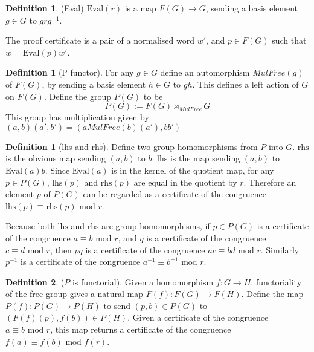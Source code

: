 \documentclass[11pt]{article} %
\theoremstyle{definition}
\theoremstyle{definition}
\theoremstyle{definition}
\theoremstyle{definition}
\theoremstyle{definition}
\newtheorem{defn}[theorem]{Definition}
\theoremstyle{definition}
\newtheorem{subdef}{Definition}[theorem]
\begin{document}
\begin{defn}(Eval)
  $\text{Eval}(r)$ is a map $F(G) \to G$, sending a basis element $g \in G$ to $grg^{-1}$.
\end{defn}

The proof certificate is a pair of a normalised word $w'$, and
$p \in F(G)$ such that \newline $w = \text{Eval}(p) w'$.

\begin{defn}[P functor]
  For any $g \in G$ define an automorphism $MulFree(g)$ of $F(G)$, by sending a basis
  element $h \in G$ to $gh$. This defines a left action of $G$ on $F(G)$.
  Define the group $P(G)$ to be
  \begin{equation}
  P(G) := F(G) \rtimes_{MulFree} G
  \end{equation}
  This group has multiplication given by $(a, b) (a', b') = (a MulFree(b)(a'), bb')$
\end{defn}

\begin{subdef}[lhs and rhs]
Define two group homomorphisms from $P$ into $G$.
$\text{rhs}$ is the obvious map sending $(a, b)$ to $b$.
$\text{lhs}$ is the map sending $(a,b)$ to $\text{Eval}(a)b$.
Since $\text{Eval}(a)$ is in the kernel of the quotient map,
for any $p\in P(G)$, $\text{lhs}(p)$ and $\text{rhs}(p)$ are equal in the quotient by $r$.
Therefore an element $p$ of $P(G)$ can be regarded as a certificate of the congruence
$\text{lhs}(p) \equiv \text{rhs}(p) \text{ mod } r$.
\end{subdef}

Because both $\text{lhs}$ and $\text{rhs}$ are group homomorphisms, if $p \in P(G)$ is a certificate
of the congruence $a \equiv b \text{ mod } r$, and $q$ is a certificate of the congruence
$c \equiv d \text{ mod } r$, then $pq$ is a certificate of the congruence $ac \equiv bd \text{ mod } r$.
Similarly $p^{-1}$ is a certificate of the congruence $a^{-1} \equiv b^{-1} \text{ mod } r$.

\begin{subdef}($P$ is functorial).
  Given a homomorphism $f : G \to H$,
  functoriality of the free group gives a natural map $F(f) : F(G) \to F(H)$.
  Define the map $P(f) : P(G) \to P(H)$ to send $(p, b) \in P(G)$ to $(F(f)(p), f(b)) \in P(H)$.
  Given a certificate of the congruence $a \equiv b \text{ mod } r$, this map returns
  a certificate of the congruence $f(a) \equiv f(b) \text{ mod } f(r)$.
\end{subdef}
\end{document}
